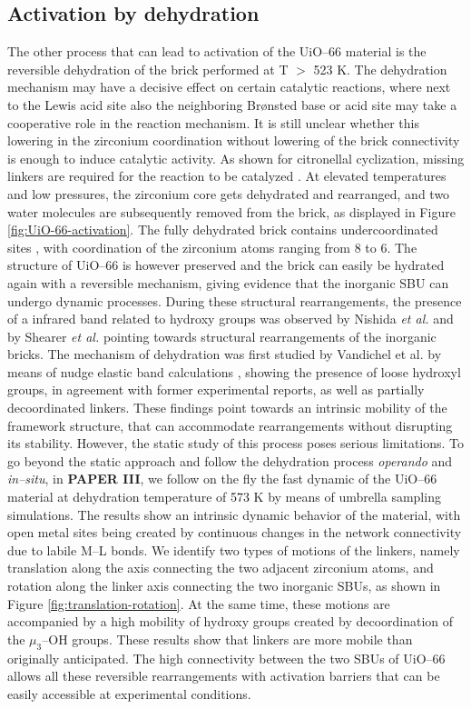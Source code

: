 \subsection*{Activation by dehydration}
The other process that can lead to activation of the UiO--66 material is the reversible dehydration of the brick performed at T $>$ 523 K. The dehydration mechanism may have a decisive effect on certain catalytic reactions, where next to the Lewis acid site also the neighboring Br\o{}nsted base or acid site may take a cooperative role in the reaction mechanism. It is still unclear whether this lowering in the zirconium coordination without lowering of the brick connectivity is enough to induce catalytic activity. As shown for citronellal cyclization, missing linkers are required for the reaction to be catalyzed \cite{vermoortele2012electronic}. 
\npar
At elevated temperatures and low pressures, the zirconium core gets dehydrated and rearranged, and two water molecules are subsequently removed from the brick, as displayed in Figure \ref{fig:UiO-66-activation}. The fully dehydrated  brick contains undercoordinated sites \cite{valenzano2011disclosing, decoste2013stability, shearer2013situ, vandichel2015active}, with coordination of the zirconium atoms ranging from 8 to 6. The structure of UiO--66 is however preserved and the brick can easily be hydrated again with a reversible mechanism, giving evidence that the inorganic SBU can undergo dynamic processes. During these structural rearrangements, the presence of a infrared band related to hydroxy groups was observed by Nishida \textit{et al.} \cite{nishida2014structural} and by Shearer \textit{et al.} \cite{shearer2013situ} pointing towards structural rearrangements of the inorganic bricks. The mechanism of dehydration was first studied by Vandichel et al. by means of nudge elastic band calculations \cite{vandichel2016water}, showing the presence of loose hydroxyl groups, in agreement with former experimental reports, as well as partially decoordinated linkers. These findings point towards an intrinsic mobility of the framework structure, that can accommodate rearrangements without disrupting its stability. However, the static study of this process poses serious limitations. 
\npar
To go beyond the static approach and follow the dehydration process \textit{operando} and \textit{in--situ}, in \textbf{PAPER III}, we follow on the fly the fast dynamic of the UiO--66 material at dehydration temperature of 573 K by means of umbrella sampling simulations. The results show an intrinsic dynamic behavior of the material, with open metal sites being created by continuous changes in the network connectivity due to labile M--L bonds. We identify two types of motions of the linkers, namely translation along the axis connecting the two adjacent zirconium atoms, and rotation along the linker axis connecting the two inorganic SBUs, as shown in Figure \ref{fig:translation-rotation}. At the same time, these motions are accompanied by a high mobility of hydroxy groups created by decoordination of the $\mu_3$--OH groups. These results show that linkers are more mobile than originally anticipated. The high connectivity between the two SBUs of UiO--66 allows all these reversible rearrangements with activation barriers that can be easily accessible at experimental conditions. 
